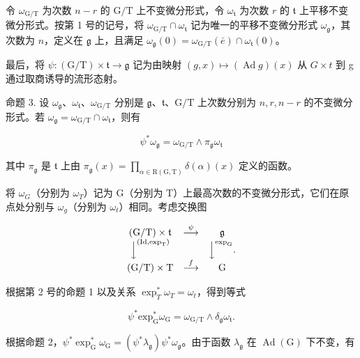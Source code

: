 令 \(\omega_{\mathrm{G / T}}\) 为次数 \(n - r\) 的 \(\mathrm{G / T}\) 上不变微分形式，令 \(\omega_{\mathfrak{t}}\) 为次数 \(r\) 的 \(\mathfrak{t}\) 上平移不变微分形式。按第 1 号的记号，将 \(\omega_{\mathrm{G / T}} \cap \omega_{\mathfrak{t}}\) 记为唯一的平移不变微分形式 \(\omega_{\mathfrak{g}}\)，其次数为 \(n\)，定义在 \(\mathfrak{g}\) 上，且满足 \(\omega_{\mathfrak{g}}(0) = \omega_{\mathrm{G / T}}(\bar{e}) \cap \omega_{\mathfrak{t}}(0)\)。

最后，将 \(\psi:(\mathrm{G}/\mathrm{T})\times\mathfrak{t}\to\mathfrak{g}\) 记为由映射 \((g,x)\mapsto(\operatorname{Ad}g)(x)\) 从 \(G\times t\) 到 g 通过取商诱导的流形态射。

命题 3. 设 \(\omega_{\mathfrak{g}}\)、\(\omega_{\mathfrak{t}}\)、\(\omega_{\mathrm{G / T}}\) 分别是 \(\mathfrak{g}\)、\(\mathfrak{t}\)、\(\mathrm{G / T}\) 上次数分别为 \(n, r, n - r\) 的不变微分形式。若 \(\omega_{\mathfrak{g}} = \omega_{\mathrm{G / T}} \cap \omega_{\mathfrak{t}}\)，则有

\[
\psi^ {*} \omega_ {\mathfrak {g}} = \omega_ {\mathrm{G/T}} \wedge \pi_ {\mathfrak {g}} \omega_ {\mathfrak {t}}
\]

其中 \(\pi_{\mathfrak{g}}\) 是 \(\mathfrak{t}\) 上由 \(\pi_{\mathfrak{g}}(x) = \prod_{\alpha \in \mathrm{R}(\mathrm{G},\mathrm{T})}\delta (\alpha)(x)\) 定义的函数。

将 \(\omega_{G}\)（分别为 \(\omega_{T}\)）记为 G（分别为 T）上最高次数的不变微分形式，它们在原点处分别与 \(\omega_{g}\)（分别为 \(\omega_{t}\)）相同。考虑交换图

\[
\begin{array}{c c c} (\mathrm{G} / \mathrm{T}) \times \mathfrak {t} & \stackrel {{\psi}} {{\longrightarrow}} & \mathfrak {g} \\ \Big \downarrow^ {(\mathrm{Id}, \exp_ {\mathrm{T}})} & & \Big \downarrow^ {\exp_ {\mathrm{G}}} . \\ (\mathrm{G} / \mathrm{T}) \times \mathrm{T} & \stackrel {{f}} {{\longrightarrow}} & \mathrm{G} \end{array}
\]

根据第 2 号的命题 1 以及关系 \(\exp_{T}^{*}\omega_{T} = \omega_{t}\)，得到等式

\[
\psi^ {*} \mathrm{exp} _ {\mathrm{G}} ^ {*} \omega_ {\mathrm{G}} = \omega_ {\mathrm{G/T}} \wedge \delta_ {\mathfrak {g}} \omega_ {\mathfrak {t}}.
\]

根据命题 2，\(\psi^{*}\exp_{\mathrm{G}}^{*}\omega_{\mathrm{G}} = (\psi^{*}\lambda_{\mathfrak{g}})\psi^{*}\omega_{\mathfrak{g}}\)。由于函数 \(\lambda_{\mathfrak{g}}\) 在 \(\operatorname{Ad}(\mathrm{G})\) 下不变，有

